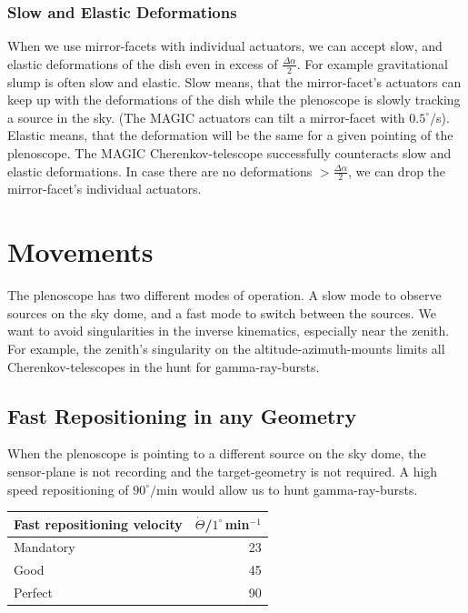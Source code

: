 \documentclass[11pt,a4paper,oneside,titlepage]{article}
\begin{document}
\subsubsection{Slow and Elastic Deformations}
%
When we use mirror-facets with individual actuators, we can accept slow, and elastic deformations of the dish even in excess of $\frac{\Delta \alpha}{2}$.
%
For example gravitational slump is often slow and elastic.
%
Slow means, that the mirror-facet's actuators can keep up with the deformations of the dish while the plenoscope is slowly tracking a source in the sky.
%
(The MAGIC actuators can tilt a mirror-facet with $0.5^\circ/$s).
%
Elastic means, that the deformation will be the same for a given pointing of the plenoscope.
%
The MAGIC Cherenkov-telescope successfully counteracts slow and elastic deformations.
%
In case there are no deformations $> \frac{\Delta \alpha}{2}$, we can drop the mirror-facet's individual actuators.
\section{Movements}
The plenoscope has two different modes of operation.
%
A slow mode to observe sources on the sky dome, and a fast mode to switch between the sources.
%
We want to avoid singularities in the inverse kinematics, especially near the zenith.
%
For example, the zenith's singularity on the altitude-azimuth-mounts limits all Cherenkov-telescopes in the hunt for gamma-ray-bursts.
\subsection{Fast Repositioning in any Geometry}
%
When the plenoscope is pointing to a different source on the sky dome, the sensor-plane is not recording and the target-geometry is not required.
%
A high speed repositioning of $90^\circ/$min would allow us to hunt gamma-ray-bursts.
%
\begin{table}[H]
    \begin{center}
        \begin{tabular}{lr}
            Fast repositioning velocity & $\dot{\Theta}$/$1^\circ$\,min$^{-1}$\\
            \toprule
            Mandatory & 23\\
            Good      & 45\\
            Perfect   & 90\\
            \bottomrule
        \end{tabular}
    \end{center}
\end{table}
\end{document}
